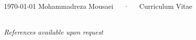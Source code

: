 \documentclass[11pt, a4paper]{awesome-cv}
\begin{document}
\makecvheader

\makecvfooter
  {\today}
  {Mohammadreza Mousaei~~~·~~~Curriculum Vitae}
  {\thepage}
























%

\\

\textit{References available upon request}


\end{document}
